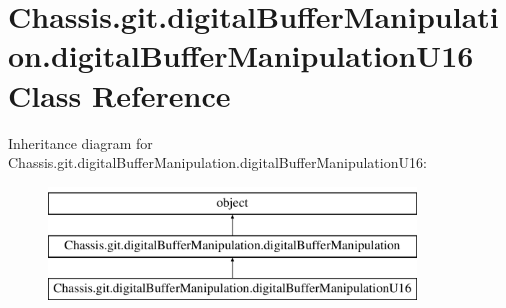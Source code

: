 \hypertarget{class_chassis_8git_1_1digital_buffer_manipulation_1_1digital_buffer_manipulation_u16}{\section{Chassis.\-git.\-digital\-Buffer\-Manipulation.\-digital\-Buffer\-Manipulation\-U16 Class Reference}
\label{class_chassis_8git_1_1digital_buffer_manipulation_1_1digital_buffer_manipulation_u16}
}
Inheritance diagram for Chassis.\-git.\-digital\-Buffer\-Manipulation.\-digital\-Buffer\-Manipulation\-U16\-:\begin{figure}[H]
\begin{center}
\leavevmode
\includegraphics[height=3.000000cm]{class_chassis_8git_1_1digital_buffer_manipulation_1_1digital_buffer_manipulation_u16}
\end{center}
\end{figure}
